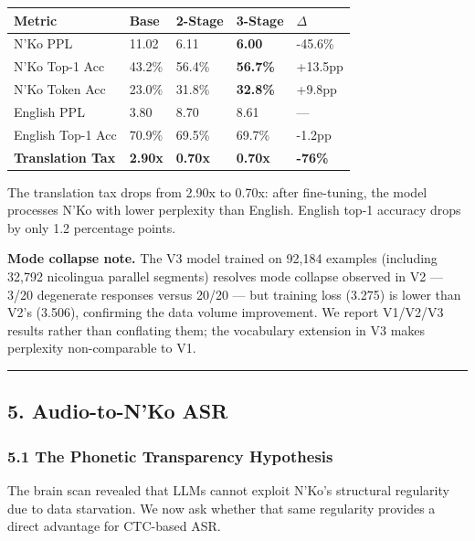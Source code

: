 \documentclass[
]{article}
\newcounter{none} %
\begin{document}
{\def\LTcaptype{none} %
\begin{longtable}[]{@{}lllll@{}}
\toprule\noalign{}
Metric & Base & 2-Stage & 3-Stage & \(\Delta\) \\
\midrule\noalign{}
\endhead
\bottomrule\noalign{}
\endlastfoot
N'Ko PPL & 11.02 & 6.11 & \textbf{6.00} & -45.6\% \\
N'Ko Top-1 Acc & 43.2\% & 56.4\% & \textbf{56.7\%} & +13.5pp \\
N'Ko Token Acc & 23.0\% & 31.8\% & \textbf{32.8\%} & +9.8pp \\
English PPL & 3.80 & 8.70 & 8.61 & --- \\
English Top-1 Acc & 70.9\% & 69.5\% & 69.7\% & -1.2pp \\
\textbf{Translation Tax} & \textbf{2.90x} & \textbf{0.70x} &
\textbf{0.70x} & \textbf{-76\%} \\
\end{longtable}
}

The translation tax drops from 2.90x to 0.70x: after fine-tuning, the
model processes N'Ko with lower perplexity than English. English top-1
accuracy drops by only 1.2 percentage points.

\textbf{Mode collapse note.} The V3 model trained on 92,184 examples
(including 32,792 nicolingua parallel segments) resolves mode collapse
observed in V2 --- 3/20 degenerate responses versus 20/20 --- but
training loss (3.275) is lower than V2's (3.506), confirming the data
volume improvement. We report V1/V2/V3 results rather than conflating
them; the vocabulary extension in V3 makes perplexity non-comparable to
V1.

\begin{center}\rule{0.5\linewidth}{0.5pt}\end{center}

\subsection{5. Audio-to-N'Ko ASR}\label{audio-to-nko-asr}

\subsubsection{5.1 The Phonetic Transparency
Hypothesis}\label{the-phonetic-transparency-hypothesis}

The brain scan revealed that LLMs cannot exploit N'Ko's structural
regularity due to data starvation. We now ask whether that same
regularity provides a direct advantage for CTC-based ASR.
\end{document}
